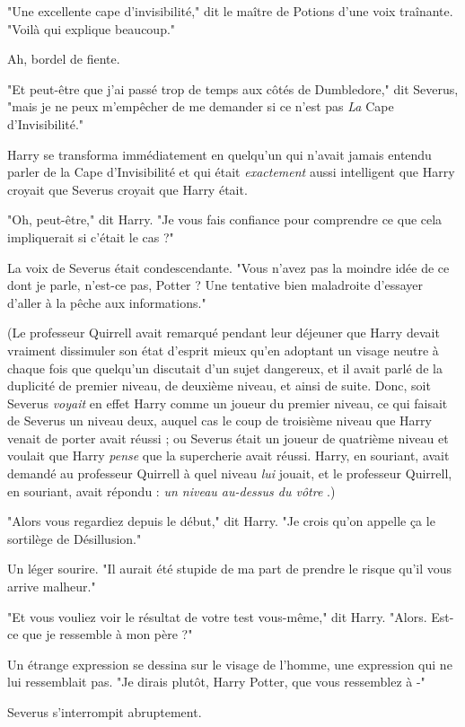"Une excellente cape d'invisibilité," dit le maître de Potions d'une voix traînante. "Voilà qui explique beaucoup."

Ah, bordel de fiente.

"Et peut-être que j'ai passé trop de temps aux côtés de Dumbledore," dit Severus, "mais je ne peux m'empêcher de me demander si ce n'est pas \emph{La}  Cape d'Invisibilité."

Harry se transforma immédiatement en quelqu'un qui n'avait jamais entendu parler de la Cape d'Invisibilité et qui était \emph{exactement}  aussi intelligent que Harry croyait que Severus croyait que Harry était.

"Oh, peut-être," dit Harry. "Je vous fais confiance pour comprendre ce que cela impliquerait si c'était le cas ?"

La voix de Severus était condescendante. "Vous n'avez pas la moindre idée de ce dont je parle, n'est-ce pas, Potter ? Une tentative bien maladroite d'essayer d'aller à la pêche aux informations."

(Le professeur Quirrell avait remarqué pendant leur déjeuner que Harry devait vraiment dissimuler son état d'esprit mieux qu'en adoptant un visage neutre à chaque fois que quelqu'un discutait d'un sujet dangereux, et il avait parlé de la duplicité de premier niveau, de deuxième niveau, et ainsi de suite. Donc, soit Severus \emph{voyait}  en effet Harry comme un joueur du premier niveau, ce qui faisait de Severus un niveau deux, auquel cas le coup de troisième niveau que Harry venait de porter avait réussi ; ou Severus était un joueur de quatrième niveau et voulait que Harry \emph{pense}  que la supercherie avait réussi. Harry, en souriant, avait demandé au professeur Quirrell à quel niveau \emph{lui } jouait, et le professeur Quirrell, en souriant, avait répondu : \emph{un niveau au-dessus du vôtre} .)

"Alors vous regardiez depuis le début," dit Harry. "Je crois qu'on appelle ça le sortilège de Désillusion."

Un léger sourire. "Il aurait été stupide de ma part de prendre le risque qu'il vous arrive malheur."

"Et vous vouliez voir le résultat de votre test vous-même," dit Harry. "Alors. Est-ce que je ressemble à mon père ?"

Un étrange expression se dessina sur le visage de l'homme, une expression qui ne lui ressemblait pas. "Je dirais plutôt, Harry Potter, que vous ressemblez à -"

Severus s'interrompit abruptement.

